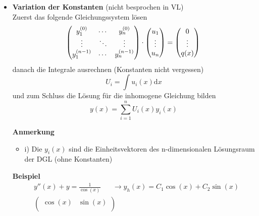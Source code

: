 \documentclass[8pt, a4paper, landscape, fleqn]{scrartcl}
\newenvironment {example}
				{\begin{itshape} \begin{small}}
				{\end{small} \end{itshape}}
\newenvironment {annotation}[1]
				{\begin{itshape} \begin{small} \textbf{#1} \begin{itemize}}
				{\end{itemize} \end{small} \end{itshape}}
\begin{document}
\begin{multicols*}{3}
\begin{itemize}
\begin{annotation}{Anmerkungen}
						Erinnere: $e^{ix} = cos(x) + i sin(x)$
						\item [iv)] Wenn möglich der Ansatz vom Typ der rechten Seite anwenden (oder Ansatztabelle), sonst  Variation der Konstanten
					\end{annotation}  
					\item \textbf{Variation der Konstanten} (nicht besprochen in VL)\\
					Zuerst das folgende Gleichungssystem lösen
					\begin{equation*}
						\begin{pmatrix}
							y^{(0)}_1 &\cdots &y_n^{(0)}\\
							\vdots &\ddots &\vdots\\
							y_1^{(n-1)} &\cdots &y_n^{(n-1)}
						\end{pmatrix}
						\cdot
						\begin{pmatrix}								
							u_1\\ \vdots\\ u_n
						\end{pmatrix}
						=
						\begin{pmatrix}
							0\\ \vdots\\ q(x)
						\end{pmatrix}\\							
					\end{equation*}
					danach die Integrale ausrechnen (Konstanten nicht vergessen)
					\begin{equation*}
						U_i=\int u_i(x)\text{d}x
					\end{equation*}
					und zum Schluss die Lösung für die inhomogene Gleichung bilden
					\begin{equation*}
						y(x)=\sum_{i=1}^{n}U_i(x)y_i(x)
					\end{equation*}
					\begin{annotation}{Anmerkung}
						\item[i)] Die $y_i(x)$ sind die Einheitsvektoren des n-dimensionalen Lösungsraum der DGL (ohne Konstanten)
					\end{annotation}
					\begin{example}
						\textbf{Beispiel}
						\begin{align*}
							&y''(x)+y=\frac{1}{\cos(x)} \hspace{20pt} \rightarrow y_h(x)=C_1\cos(x) +C_2\sin(x)\\
							&\begin{pmatrix}
								\cos(x) &\sin(x)\\

\end{pmatrix}
\end{align*}
\end{example}
\end{itemize}
\end{multicols*}
\end{document}
